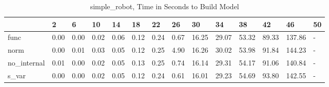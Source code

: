 \begin{table}
\caption{simple_robot, Time in Seconds to Build Model}
\label{simple_robot_model_time}
\begin{tabular}{llllllllllllll}
\toprule
 & 2 & 6 & 10 & 14 & 18 & 22 & 26 & 30 & 34 & 38 & 42 & 46 & 50 \\
\midrule
func & 0.00 & 0.00 & 0.02 & 0.06 & 0.12 & 0.24 & 0.67 & 16.25 & 29.07 & 53.32 & 89.33 & 137.86 & - \\
norm & 0.00 & 0.01 & 0.03 & 0.05 & 0.12 & 0.25 & 4.90 & 16.26 & 30.02 & 53.98 & 91.84 & 144.23 & - \\
no_internal & 0.01 & 0.00 & 0.02 & 0.05 & 0.13 & 0.25 & 0.74 & 16.14 & 29.31 & 54.17 & 91.06 & 140.84 & - \\
s_var & 0.00 & 0.00 & 0.02 & 0.05 & 0.12 & 0.24 & 0.61 & 16.01 & 29.23 & 54.69 & 93.80 & 142.55 & - \\
\bottomrule
\end{tabular}
\end{table}

